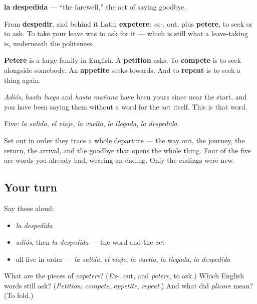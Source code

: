 \begin{cousinweb}
\textbf{la despedida} — \textquotedblleft{}the farewell,\textquotedblright{} the act of saying goodbye.

From \textbf{despedir}, and behind it Latin \textbf{expetere}: \emph{ex-}, out, plus \textbf{petere}, to seek or to ask. To take your leave was to ask for it — which is still what a leave-taking is, underneath the politeness.

\textbf{Petere} is a large family in English. A \textbf{petition} asks. To \textbf{compete} is to seek alongside somebody. An \textbf{appetite} seeks towards. And to \textbf{repeat} is to seek a thing again.

\emph{Adiós}, \emph{hasta luego} and \emph{hasta mañana} have been yours since near the start, and you have been saying them without a word for the act itself. This is that word.
\end{cousinweb}

\begin{grammarlens}[title={What you've built}]
Five: \emph{la salida}, \emph{el viaje}, \emph{la vuelta}, \emph{la llegada}, \emph{la despedida}.

Set out in order they trace a whole departure — the way out, the journey, the return, the arrival, and the goodbye that opens the whole thing. Four of the five are words you already had, wearing an ending. Only the endings were new.
\end{grammarlens}

\subsection*{Your turn}
Say these aloud:

\begin{itemize}
\raggedright
  \item \emph{la despedida}
  \item \emph{adiós}, then \emph{la despedida} — the word and the act
  \item all five in order — \emph{la salida}, \emph{el viaje}, \emph{la vuelta}, \emph{la llegada}, \emph{la despedida}
\end{itemize}

\begin{tcolorbox}[breakable,colback=teal!4,colframe=teal!35!black,title={Before you move on}]
What are the pieces of \emph{expetere}? (\emph{Ex-}, out, and \emph{petere}, to ask.) Which English words still ask? (\emph{Petition}, \emph{compete}, \emph{appetite}, \emph{repeat}.) And what did \emph{plicare} mean? (To fold.)
\end{tcolorbox}
